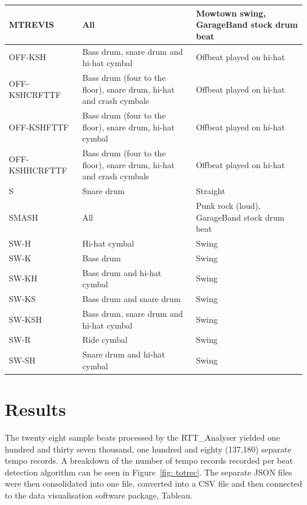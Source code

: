 \documentclass[a4paper, 11pt]{article}
\begin{document}
\begin{table}[htbp]
\begin{tabular}{|p{3cm}|p{5cm}|l|}
\hline 
MTREVIS & All & Mowtown swing, GarageBand stock drum beat\\
\hline 
OFF-KSH & Bass drum, snare drum and hi-hat cymbal & Offbeat played on hi-hat\\
\hline 
OFF-KSHCRFTTF & Bass drum (four to the floor), snare drum, hi-hat and crash cymbals & Offbeat played on hi-hat\\
\hline 
OFF-KSHFTTF & Bass drum (four to the floor), snare drum, hi-hat cymbal & Offbeat played on hi-hat\\
\hline 
OFF-KSHHCRFTTF & Bass drum (four to the floor), snare drum, hi-hat and crash cymbals & Offbeat played on hi-hat\\
\hline 
S & Snare drum & Straight\\
\hline 
SMASH & All & Punk rock (loud), GarageBand stock drum beat\\
\hline 
SW-H & Hi-hat cymbal & Swing\\
\hline 
SW-K & Bass drum & Swing\\
\hline 
SW-KH & Bass drum and hi-hat cymbal & Swing\\
\hline 
SW-KS & Bass drum and snare drum & Swing\\
\hline 
SW-KSH & Bass drum, snare drum and hi-hat cymbal & Swing\\
\hline 
SW-R & Ride cymbal & Swing\\
\hline 
SW-SH & Snare drum and hi-hat cymbal & Swing\\
\hline
\end{tabular}
\label{tab: beats}
\end{table}
\clearpage
\maketitle \section{Results}
The twenty eight sample beats processed by the RTT\_Analyser yielded one hundred and thirty seven thousand, one hundred and eighty (137,180) separate tempo records. A breakdown of the number of tempo records recorded per beat detection algorithm can be seen in Figure~\ref{fig: totrec}. The separate JSON files were then consolidated into one file, converted into a CSV file and then connected to the data visualisation software package, Tableau\cite{tableau}.
\end{document}
